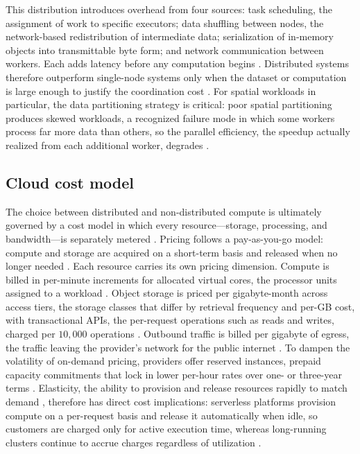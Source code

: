 This distribution introduces overhead from four sources: task scheduling, the assignment of work to specific executors; data shuffling between nodes, the network-based redistribution of intermediate data; serialization of in-memory objects into transmittable byte form; and network communication between workers. Each adds latency before any computation begins \parencite{mcsherry2015_scalability_but_at_what_cost,zaharia2012_resilient_distributed_datasets}. Distributed systems therefore outperform single-node systems only when the dataset or computation is large enough to justify the coordination cost \parencite{mcsherry2015_scalability_but_at_what_cost}. For spatial workloads in particular, the data partitioning strategy is critical: poor spatial partitioning produces skewed workloads, a recognized failure mode in which some workers process far more data than others, so the parallel efficiency, the speedup actually realized from each additional worker, degrades \parencite{tang2020_locationspark_distributed_spatial_query}.

\subsection{Cloud cost model}
\label{background:cloud-native-data-architecture:cloud-cost-model}
The choice between distributed and non-distributed compute is ultimately governed by a cost model in which every resource---storage, processing, and bandwidth---is separately metered \parencite{mell2011_nist_definition_of_cloud_computing}. Pricing follows a pay-as-you-go model: compute and storage are acquired on a short-term basis and released when no longer needed \parencite{armbrust2010_view_of_cloud_computing}. Each resource carries its own pricing dimension. Compute is billed in per-minute increments for allocated virtual cores, the processor units assigned to a workload \parencite{microsoft2024_virtual_machines_pricing}. Object storage is priced per gigabyte-month across access tiers, the storage classes that differ by retrieval frequency and per-GB cost, with transactional APIs, the per-request operations such as reads and writes, charged per $10,000$ operations \parencite{microsoft2024_azure_data_lake_storage_pricing}. Outbound traffic is billed per gigabyte of egress, the traffic leaving the provider's network for the public internet \parencite{microsoft2024_bandwidth_pricing}. To dampen the volatility of on-demand pricing, providers offer reserved instances, prepaid capacity commitments that lock in lower per-hour rates over one- or three-year terms \parencite{microsoft2024_azure_reservations}. Elasticity, the ability to provision and release resources rapidly to match demand \parencite{mell2011_nist_definition_of_cloud_computing}, therefore has direct cost implications: serverless platforms provision compute on a per-request basis and release it automatically when idle, so customers are charged only for active execution time, whereas long-running clusters continue to accrue charges regardless of utilization \parencite{jonas2019_berkeley_view_on_serverless_computing}.